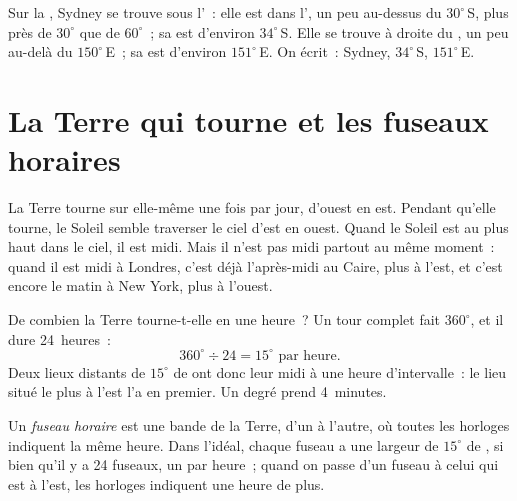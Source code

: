 \begin{example}\label{ex:g6:latitude-longitude:sydney}
Sur la , Sydney se trouve sous l'~: elle est dans
l', un peu au-dessus du  $30^\circ$\,S, plus près
de $30^\circ$ que de $60^\circ$~; sa  est d'environ $34^\circ$\,S.
Elle se trouve à droite du , un peu au-delà du 
$150^\circ$\,E~; sa  est d'environ $151^\circ$\,E. On écrit~:
Sydney, $34^\circ$\,S, $151^\circ$\,E.
\end{example}

\section{La Terre qui tourne et les fuseaux horaires}

La Terre tourne sur elle-même une fois par jour, d'ouest en est. Pendant
qu'elle tourne, le Soleil semble traverser le ciel d'est en ouest. Quand le
Soleil est au plus haut dans le ciel, il est midi. Mais il n'est pas midi
partout au même moment~: quand il est midi à Londres, c'est déjà
l'après-midi au Caire, plus à l'est, et c'est encore le matin à New York,
plus à l'ouest.

De combien la Terre tourne-t-elle en une heure~? Un tour complet fait
$360^\circ$, et il dure 24~heures~:
\[
360^\circ \div 24 = 15^\circ \text{ par heure.}
\]
Deux lieux distants de $15^\circ$ de  ont donc leur midi à une
heure d'intervalle~: le lieu situé le plus à l'est l'a en premier. Un degré
prend 4~minutes.

\begin{definition}\label{def:g6:latitude-longitude:time-zone}
Un \emph{fuseau horaire} est une bande de la Terre,
d'un  à l'autre, où toutes les horloges indiquent la même heure. Dans
l'idéal, chaque fuseau a une largeur de $15^\circ$ de , si bien
qu'il y a 24 fuseaux, un par heure~; quand on passe d'un fuseau à celui
qui est à l'est, les horloges indiquent une heure de plus.
\end{definition}

